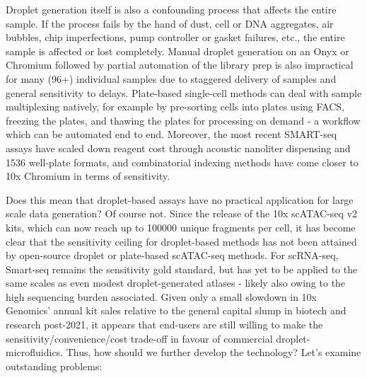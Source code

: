 Droplet generation itself is also a confounding process that affects the entire sample. If the process fails by the hand of dust, cell or DNA aggregates, air bubbles, chip imperfections, pump controller or gasket failures, etc., the entire sample is affected or lost completely. Manual droplet generation on an Onyx or Chromium followed by partial automation of the library prep is also impractical for many (96+) individual samples due to staggered delivery of samples and general sensitivity to delays. Plate-based single-cell methods can deal with sample multiplexing natively, for example by pre-sorting cells into plates using FACS, freezing the plates, and thawing the plates for processing on demand - a workflow which can be automated end to end. Moreover, the most recent SMART-seq assays have scaled down reagent cost through acoustic nanoliter dispensing and \num{1536} well-plate formats, and combinatorial indexing methods have come closer to 10x Chromium in terms of sensitivity.

Does this mean that droplet-based assays have no practical application for large scale data generation? Of course not. Since the release of the 10x scATAC-seq v2 kits, which can now reach up to \num{100000} unique fragments per cell, it has become clear that the sensitivity ceiling for droplet-based methods has not been attained by open-source droplet or plate-based scATAC-seq methods. For scRNA-seq, Smart-seq remains the sensitivity gold standard, but has yet to be applied to the same scales as even modest droplet-generated atlases - likely also owing to the high sequencing burden associated. Given only a small slowdown in 10x Genomics' annual kit sales relative to the general capital slump in biotech and research post-2021, it appears that end-users are still willing to make the sensitivity/convenience/cost trade-off in favour of commercial droplet-microfluidics. Thus, how should we further develop the technology? Let's examine outstanding problems:

